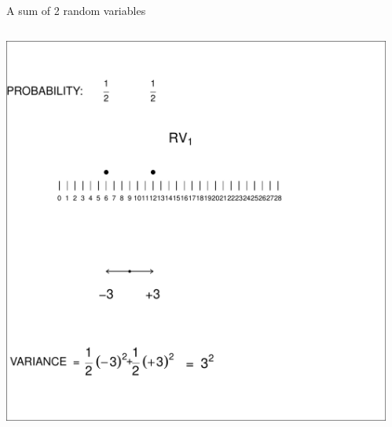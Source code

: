 \documentclass[10pt]{beamer}\usepackage[]{graphicx}\usepackage[]{color}
\newenvironment{knitrout}{}{} %
\begin{document}
\begin{frame}[fragile]{A sum of 2 random variables}
	

	
	
	
		\begin{columns}
		\begin{column}{0.5\textwidth}  %
\begin{knitrout}\tiny
{}\color{fgcolor}

{\centering \includegraphics[width=1\linewidth]{figure/unnamed-chunk-8-1} 

}


\end{knitrout}
			
					\end{column}
		\begin{column}{0.5\textwidth}
\begin{knitrout}\tiny
{}\color{fgcolor}


\end{knitrout}
\end{column}
\end{columns}
\end{frame}
\end{document}
